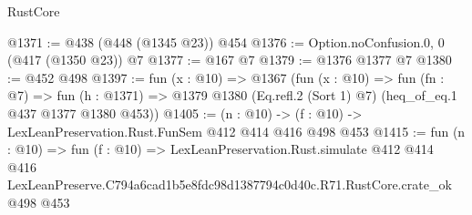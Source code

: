 \begin{lexlean}{RustCore}
\begin{coremodule}
@1371 := @438 (@448 (@1345 @23)) @454
@1376 := Option.noConfusion.{0, 0} (@417 (@1350 @23)) @7
@1377 := @167 @7
@1379 := @1376 @1377 @7
@1380 := @452 @498
@1397 := fun (x : @10) =>
  @1367
    (fun (x : @10) =>
    fun (fn : @7) =>
    fun (h : @1371) => @1379 @1380 (Eq.refl.{2} (Sort 1) @7) (heq_of_eq.{1} @437 @1377 @1380 @453))
@1405 := (n : @10) -> (f : @10) -> LexLeanPreservation.Rust.FunSem @412 @414 @416 @498 @453
@1415 := fun (n : @10) =>
  fun (f : @10) =>
  LexLeanPreservation.Rust.simulate
    @412
    @414
    @416
    LexLeanPreserve.C794a6cad1b5e8fdc98d1387794c0d40c.R71.RustCore.crate_ok
    @498
    @453
\end{coremodule}
\end{lexlean}
